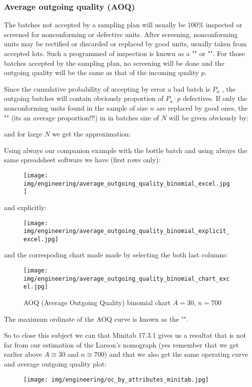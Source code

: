 	\subsubsection{Average outgoing quality (AOQ)}
	The batches not accepted by a sampling plan will usually be $100\%$ inspected or screened for nonconforming or defective units. After screening, nonconforming units may be rectified or discarded or replaced by good units, usually taken from accepted lots. Such a programmed of inspection is known as a "" or "". For those batches accepted by the sampling plan, no screening will be done and the outgoing quality will be
the same as that of the incoming quality $p$.

	Since the cumulative probability of accepting by error a bad batch is $ P_a$ , the outgoing batches will contain obviously proportion of $P_a\cdot p$ defectives. If only the nonconforming units found in
the sample of size $n$ are replaced by good ones, the "" (its an average proportion!!!) in in batches size of $N$ will be given obviously by:
	
	and for large $N$ we get the approximation:
	
	Using always our companion example with the bottle batch and using always the same spreadsheet software we have (first rows only):
	\begin{figure}[H]
		\centering
		\texttt{[image: img/engineering/average\_outgoing\_quality\_binomial\_excel.jpg]}
	\end{figure}
	and explicitly:
	\begin{figure}[H]
		\centering
		\texttt{[image: img/engineering/average\_outgoing\_quality\_binomial\_explicit\_excel.jpg]}
	\end{figure}
	and the correspoding chart made made by selecting the both last columns:
	\begin{figure}[H]
		\centering
		\texttt{[image: img/engineering/average\_outgoing\_quality\_binomial\_chart\_excel.jpg]}
		\caption{AOQ (Average Outgoing Quality) binomial chart $A=30$, $n=700$}
	\end{figure}
	The maximum ordinate of the AOQ curve is known as the "".
	
	So to close this subject we can that Minitab 17.3.1 gives us a resultat that is not far from our estimation of the Larson's nomograph (yes remember that we get earlier above $A\cong 30$ and $n\cong 700$) and that we also get the same operating curve and average outgoing quality plot:
	\begin{figure}[H]
		\centering
		\texttt{[image: img/engineering/oc\_by\_attributes\_minitab.jpg]}
	\end{figure}
	
